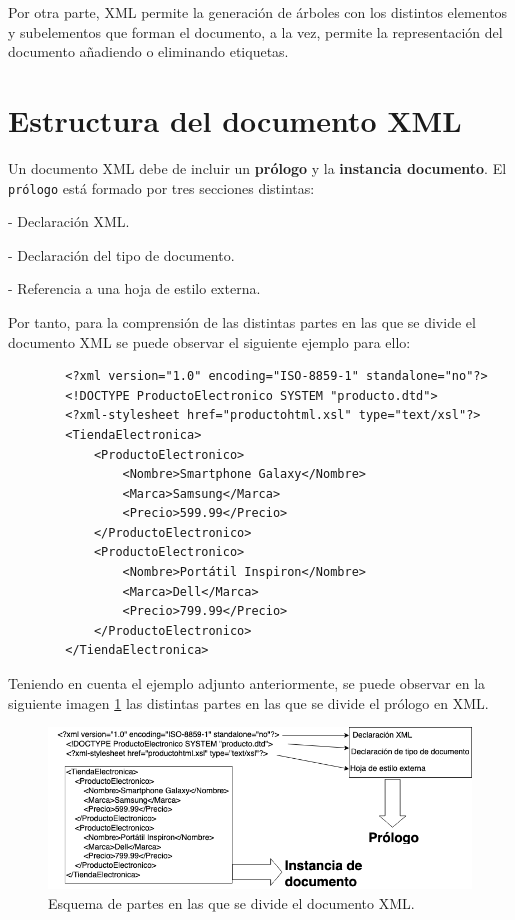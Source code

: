 \documentclass[11pt]{report}
\begin{document}
Por otra parte, XML permite la generación de árboles con los distintos elementos y subelementos que forman el documento, a la vez, permite la representación del documento añadiendo o eliminando etiquetas.

\section{Estructura del documento XML}

Un documento XML debe de incluir un \textbf{prólogo} y la \textbf{instancia documento}. El \texttt{prólogo} está formado por tres secciones distintas:

- Declaración XML.

- Declaración del tipo de documento.

- Referencia a una hoja de estilo externa.

Por tanto, para la comprensión de las distintas partes en las que se divide el documento XML se puede observar el siguiente ejemplo para ello:

\begin{verbatim}
		<?xml version="1.0" encoding="ISO-8859-1" standalone="no"?>
		<!DOCTYPE ProductoElectronico SYSTEM "producto.dtd">
		<?xml-stylesheet href="productohtml.xsl" type="text/xsl"?>
		<TiendaElectronica>
			<ProductoElectronico>
				<Nombre>Smartphone Galaxy</Nombre>
				<Marca>Samsung</Marca>
				<Precio>599.99</Precio>
			</ProductoElectronico>
			<ProductoElectronico>
				<Nombre>Portátil Inspiron</Nombre>
				<Marca>Dell</Marca>
				<Precio>799.99</Precio>
			</ProductoElectronico>
		</TiendaElectronica>
	\end{verbatim}

Teniendo en cuenta el ejemplo adjunto anteriormente, se puede observar en la siguiente imagen \ref{fig:Example-XML} las distintas partes en las que se divide el prólogo en XML.

\begin{figure}[H]
	\centering
	\includegraphics[scale=0.7]{../img/XML-Example-1.png}
	\caption{Esquema de partes en las que se divide el documento XML.}
	\label{fig:Example-XML}
\end{figure}
\end{document}
